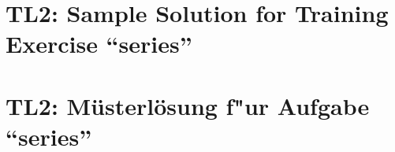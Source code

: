
\thispagestyle{empty}
\ifenglish
\section*{TL2: Sample Solution for Training Exercise ``series''}

\fi
\ifgerman
\section*{TL2: M\"usterl\"osung f"ur Aufgabe ``series''}

\fi


